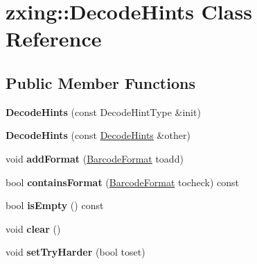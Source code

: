\hypertarget{classzxing_1_1_decode_hints}{}\section{zxing\+:\+:Decode\+Hints Class Reference}
\label{classzxing_1_1_decode_hints}
\subsection*{Public Member Functions}
\begin{DoxyCompactItemize}
\item 
\mbox{\label{classzxing_1_1_decode_hints_ac4fc937d3622f2f8b8ebb9cb83ebff4d}} 
{\bfseries Decode\+Hints} (const Decode\+Hint\+Type \&init)
\item 
\mbox{\label{classzxing_1_1_decode_hints_a692fcf62d813268c04ba4338bb523745}} 
{\bfseries Decode\+Hints} (const \mbox{\hyperlink{classzxing_1_1_decode_hints}{Decode\+Hints}} \&other)
\item 
\mbox{\label{classzxing_1_1_decode_hints_a114ac92ceee7d826ac079362b572a69f}} 
void {\bfseries add\+Format} (\mbox{\hyperlink{classzxing_1_1_barcode_format}{Barcode\+Format}} toadd)
\item 
\mbox{\label{classzxing_1_1_decode_hints_a871c411c1b2f7b03bceb39a00ee26bf4}} 
bool {\bfseries contains\+Format} (\mbox{\hyperlink{classzxing_1_1_barcode_format}{Barcode\+Format}} tocheck) const
\item 
\mbox{\label{classzxing_1_1_decode_hints_af6ba4b4ab6568244608fb6cd8e38db7a}} 
bool {\bfseries is\+Empty} () const
\item 
\mbox{\label{classzxing_1_1_decode_hints_a657958bcfe4cc0dcf04d9b1ba8c41da3}} 
void {\bfseries clear} ()
\item 
\mbox{\label{classzxing_1_1_decode_hints_ab2a4df574bfecc3ef691e9523cc5e0cb}} 
void {\bfseries set\+Try\+Harder} (bool toset)
\item 
\mbox{\label{classzxing_1_1_decode_hints_a981139f90233cfa55a8f5bf0c66f230d}} 

\end{DoxyCompactItemize}
